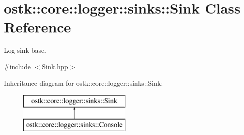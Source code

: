 \hypertarget{classostk_1_1core_1_1logger_1_1sinks_1_1_sink}{}\section{ostk\+:\+:core\+:\+:logger\+:\+:sinks\+:\+:Sink Class Reference}
\label{classostk_1_1core_1_1logger_1_1sinks_1_1_sink}


Log sink base.  




{\ttfamily \#include $<$Sink.\+hpp$>$}

Inheritance diagram for ostk\+:\+:core\+:\+:logger\+:\+:sinks\+:\+:Sink\+:\begin{figure}[H]
\begin{center}
\leavevmode
\includegraphics[height=2.000000cm]{classostk_1_1core_1_1logger_1_1sinks_1_1_sink}
\end{center}
\end{figure}
